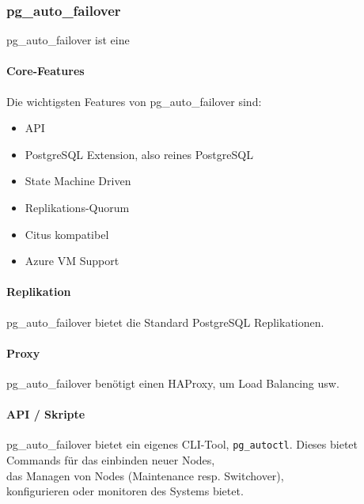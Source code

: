 
\begin{flushleft}
    \subsubsection{pg\_auto\_failover}
    pg\_auto\_failover ist eine
\end{flushleft}
\begin{flushleft}
    \paragraph{Core-Features}
    Die wichtigsten Features von pg\_auto\_failover sind:
    \begin{itemize}
        \item API
        \item PostgreSQL Extension, also reines PostgreSQL
        \item State Machine Driven
        \item Replikations-Quorum
        \item Citus kompatibel
        \item Azure VM Support
    \end{itemize}
\end{flushleft}
\begin{flushleft}
    \paragraph{Replikation}
    pg\_auto\_failover bietet die Standard PostgreSQL Replikationen.
\end{flushleft}
\begin{flushleft}
    \paragraph{Proxy}
    pg\_auto\_failover benötigt einen \Gls{HAProxy}, um Load Balancing usw. \cite{VYXTI7BS}
\end{flushleft}
\begin{flushleft}
    \paragraph{API / Skripte}
    pg\_auto\_failover bietet ein eigenes CLI-Tool, \texttt{pg\_autoctl}.
    Dieses bietet Commands für das einbinden neuer Nodes,\\
    das Managen von Nodes (Maintenance resp. Switchover),\\
    konfigurieren oder monitoren des Systems bietet\cite{4X2AKDB6}.
\end{flushleft}
